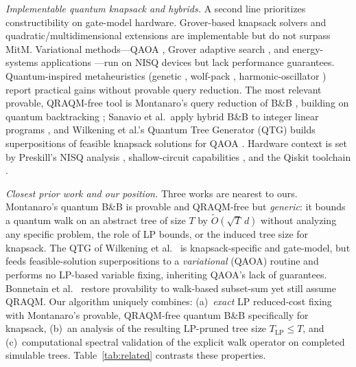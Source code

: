 \documentclass[conference]{IEEEtran} \IEEEoverridecommandlockouts
\begin{document}
\textit{Implementable quantum knapsack and hybrids.} A second line prioritizes constructibility on gate-model hardware. Grover-based knapsack solvers \cite{ref20,ref21} and quadratic/multidimensional extensions \cite{ref22} are implementable but do not surpass MitM. Variational methods---QAOA \cite{ref25}, Grover adaptive search \cite{ref26}, and energy-systems applications \cite{ref27}---run on NISQ devices but lack performance guarantees. Quantum-inspired metaheuristics (genetic \cite{ref28}, wolf-pack \cite{ref29}, harmonic-oscillator \cite{ref30}) report practical gains without provable query reduction. The most relevant provable, QRAQM-free tool is Montanaro's query reduction of B\&B \cite{ref24}, building on quantum backtracking \cite{ref35}; Sanavio et al.\ apply hybrid B\&B to integer linear programs \cite{ref36}, and Wilkening et al.'s Quantum Tree Generator (QTG) builds superpositions of feasible knapsack solutions for QAOA \cite{ref23}. Hardware context is set by Preskill's NISQ analysis \cite{ref31}, shallow-circuit capabilities \cite{ref32}, and the Qiskit toolchain \cite{ref33}.

\textit{Closest prior work and our position.} Three works are nearest to ours. Montanaro's quantum B\&B \cite{ref24} is provable and QRAQM-free but \emph{generic}: it bounds a quantum walk on an abstract tree of size $T$ by $\tilde{O}(\sqrt{T}\,d)$ without analyzing any specific problem, the role of LP bounds, or the induced tree size for knapsack. The QTG of Wilkening et al.\ \cite{ref23} is knapsack-specific and gate-model, but feeds feasible-solution superpositions to a \emph{variational} (QAOA) routine and performs no LP-based variable fixing, inheriting QAOA's lack of guarantees. Bonnetain et al.\ \cite{bonnetain2020improved} restore provability to walk-based subset-sum yet still assume QRAQM. Our algorithm uniquely combines: (a)~\emph{exact} LP reduced-cost fixing with Montanaro's provable, QRAQM-free quantum B\&B specifically for knapsack, (b)~an analysis of the resulting LP-pruned tree size $T_{\text{LP}} \le T$, and (c)~computational spectral validation of the explicit walk operator on completed simulable trees. Table~\ref{tab:related} contrasts these properties.
\end{document}
